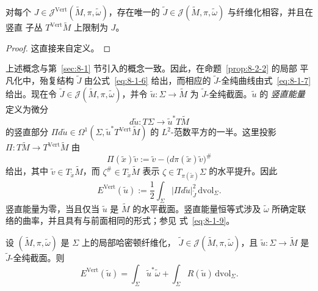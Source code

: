 \begin{lemma}\label{lem:8-2-8}
对每个 $J\in\mathcal J^{\mathrm{Vert}}(\widetilde M,\pi,\widetilde\omega)$，存在唯一的
$\widetilde J\in\mathcal J(\widetilde M,\pi,\widetilde\omega)$ 与纤维化相容，并且在竖直
子丛 $T^{\mathrm{Vert}}\widetilde M$ 上限制为 $J$。
\end{lemma}

\begin{proof}
这直接来自定义。
\end{proof}

上述概念与第~\ref{sec:8-1} 节引入的概念一致。因此，在命题~\ref{prop:8-2-2} 的局部
平凡化中，殆复结构 $\widetilde J$ 由公式~\eqref{eq:8-1-6} 给出，而相应的
$\widetilde J$-全纯曲线由式~\eqref{eq:8-1-7} 给出。现在令
$\widetilde J\in\mathcal J(\widetilde M,\pi,\widetilde\omega)$，并令
$\widetilde u:\Sigma\to\widetilde M$ 为 $\widetilde J$-全纯截面。$\widetilde u$ 的
\emph{竖直能量}定义为微分
\[
  d\widetilde u:T\Sigma\longrightarrow\widetilde u^*T\widetilde M
\]
的竖直部分
$\Pi d\widetilde u\in\Omega^1(\Sigma,\widetilde u^*T^{\mathrm{Vert}}\widetilde M)$
的 $L^2$-范数平方的一半。这里投影
$\Pi:T\widetilde M\to T^{\mathrm{Vert}}\widetilde M$ 由
\begin{equation}\label{eq:8-2-5}
  \Pi(\widetilde x)\widetilde v
  :=\widetilde v-\bigl(d\pi(\widetilde x)\widetilde v\bigr)^\#
\end{equation}
给出，其中 $\widetilde v\in T_{\widetilde x}\widetilde M$，而
$\zeta^\#\in T_{\widetilde x}\widetilde M$ 表示
$\zeta\in T_{\pi(\widetilde x)}\Sigma$ 的水平提升。因此
\[
  E^{\mathrm{Vert}}(\widetilde u)
  :=\frac12\int_\Sigma\lvert\Pi d\widetilde u\rvert_{\widetilde J}^2
  \,\mathrm{dvol}_\Sigma.
\]
竖直能量为零，当且仅当 $\widetilde u$ 是 $\widetilde M$ 的水平截面。竖直能量恒等式涉及
$\widetilde\omega$ 所确定联络的曲率，并且具有与前面相同的形式；参见
式~\eqref{eq:8-1-9}。

\begin{lemma}\label{lem:8-2-9}
设 $(\widetilde M,\pi,\widetilde\omega)$ 是 $\Sigma$ 上的局部哈密顿纤维化，
$\widetilde J\in\mathcal J(\widetilde M,\pi,\widetilde\omega)$，且
$\widetilde u:\Sigma\to\widetilde M$ 是 $\widetilde J$-全纯截面。则
\[
  E^{\mathrm{Vert}}(\widetilde u)
  =\int_\Sigma\widetilde u^*\widetilde\omega
   +\int_\Sigma R(\widetilde u)\,\mathrm{dvol}_\Sigma.
\]
\end{lemma}

